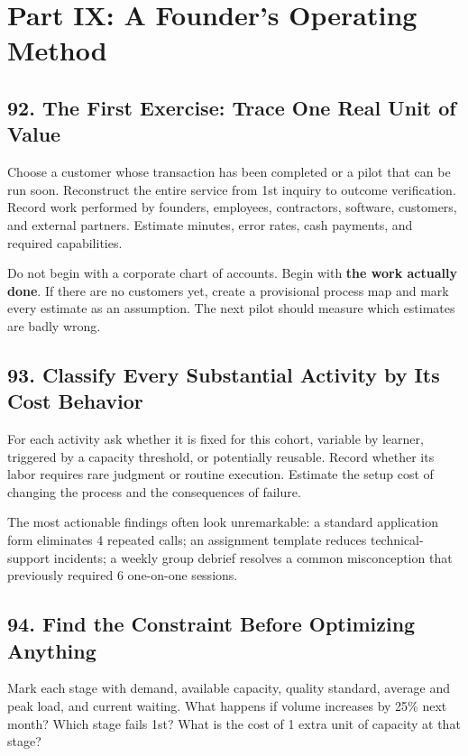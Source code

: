 \section*{Part IX: A Founder's Operating Method}

\subsection*{92. The First Exercise: Trace One Real Unit of Value}

Choose a customer whose transaction has been completed or a pilot that can be run soon. Reconstruct the entire service from 1st inquiry to outcome verification. Record work performed by founders, employees, contractors, software, customers, and external partners. Estimate minutes, error rates, cash payments, and required capabilities.

Do not begin with a corporate chart of accounts. Begin with \textbf{the work actually done}. If there are no customers yet, create a provisional process map and mark every estimate as an assumption. The next pilot should measure which estimates are badly wrong.

\subsection*{93. Classify Every Substantial Activity by Its Cost Behavior}

For each activity ask whether it is fixed for this cohort, variable by learner, triggered by a capacity threshold, or potentially reusable. Record whether its labor requires rare judgment or routine execution. Estimate the setup cost of changing the process and the consequences of failure.

The most actionable findings often look unremarkable: a standard application form eliminates 4 repeated calls; an assignment template reduces technical-support incidents; a weekly group debrief resolves a common misconception that previously required 6 one-on-one sessions.

\subsection*{94. Find the Constraint Before Optimizing Anything}

Mark each stage with demand, available capacity, quality standard, average and peak load, and current waiting. What happens if volume increases by 25\% next month? Which stage fails 1st? What is the cost of 1 extra unit of capacity at that stage?

